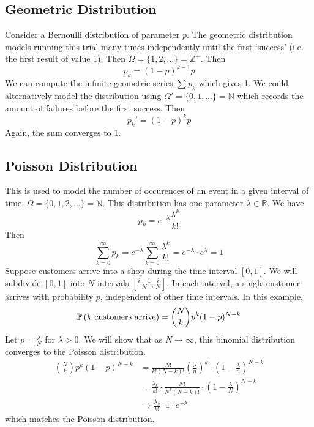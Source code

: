 \subsection{Geometric Distribution}
Consider a Bernoulli distribution of parameter \(p\). The geometric distribution models running this trial many times independently until the first `success' (i.e. the first result of value 1). Then \(\Omega = \{ 1, 2, \dots \} = \mathbb Z^+\). Then
\[ p_k = (1-p)^{k-1}p \]
We can compute the infinite geometric series \(\sum p_k\) which gives 1. We could alternatively model the distribution using \(\Omega' = \{ 0, 1, \dots \} = \mathbb N\) which records the amount of failures before the first success. Then
\[ p_k' = (1-p)^k p \]
Again, the sum converges to 1.

\subsection{Poisson Distribution}
This is used to model the number of occurences of an event in a given interval of time. \(\Omega = \{ 0, 1, 2, \dots \} = \mathbb N\). This distribution has one parameter \(\lambda \in \mathbb R\). We have
\[ p_k = e^{-\lambda} \frac{\lambda^k}{k!} \]
Then
\[ \sum_{k=0}^\infty p_k = e^{-\lambda}  \sum_{k=0}^\infty \frac{\lambda^k}{k!} = e^{-\lambda} \cdot e^{\lambda} = 1 \]
Suppose customers arrive into a shop during the time interval \([0, 1]\). We will subdivide \([0, 1]\) into \(N\) intervals \(\left[ \frac{i-1}{N}, \frac{i}{N} \right]\). In each interval, a single customer arrives with probability \(p\), independent of other time intervals. In this example,
\[ \mathbb{P}\left({k \text{ customers arrive}}\right) = \binom{N}{k} p^k (1-p)^{N-k} \]
Let \(p = \frac{\lambda}{N}\) for \(\lambda > 0\). We will show that as \(N \to \infty\), this binomial distribution converges to the Poisson distribution.
\begin{align*}
	\binom{N}{k} p^k (1-p)^{N-k} & = \frac{N!}{k!(N-k)!} \left( \frac{\lambda}{n} \right)^k \cdot \left( 1 - \frac{\lambda}{n} \right)^{N-k} \\
	                             & = \frac{\lambda_k}{k!} \cdot \frac{N!}{N^k(N-k)!} \cdot \left( 1 - \frac{\lambda}{N} \right)^{N-k}        \\
	                             & \to \frac{\lambda_k}{k!} \cdot 1 \cdot e^{-\lambda}
\end{align*}
which matches the Poisson distribution.

